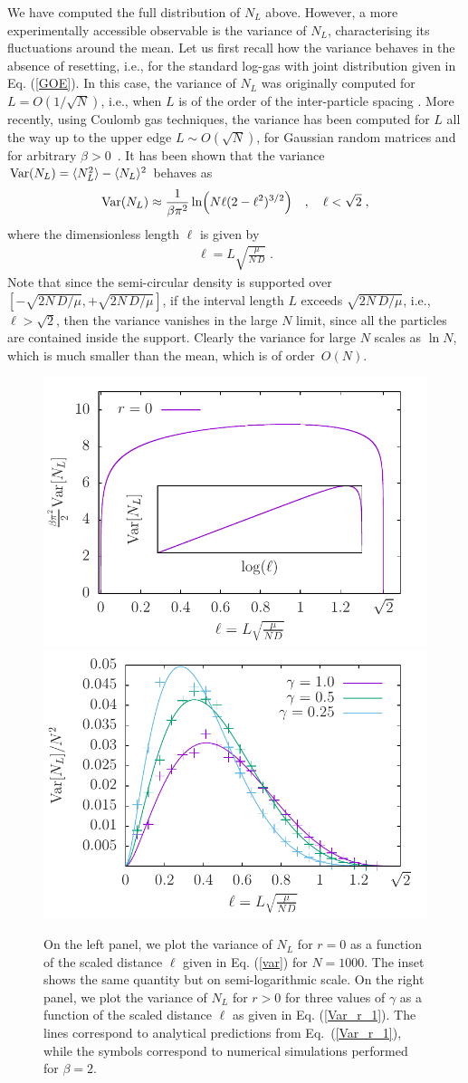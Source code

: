 \documentclass[onecolumn,superscriptaddress,
 amsmath,amssymb,
 aps,
 prd,
]{revtex4-1}
\newcommand{\bea}{\begin{eqnarray}}
\newcommand{\eea}{\end{eqnarray}}
\begin{document}
\vspace*{0.3cm}
 We have computed the full distribution of $N_L$ above. However, a more experimentally accessible observable is the variance of $N_L$, characterising its fluctuations around the mean. Let us first recall how the variance behaves in the absence of resetting, i.e., for the standard log-gas with joint distribution given in Eq. (\ref{GOE}). In this case, the variance of $N_L$ was originally computed for $L = O(1/\sqrt{N})$, i.e., when $L$ is of the order of the inter-particle spacing \cite{DM63,CL95,FS95}. More recently, using Coulomb gas techniques, the variance has been computed for $L$ all the way up to the upper edge $L \sim O(\sqrt{N})$, for Gaussian random matrices and for arbitrary $\beta > 0$~\cite{MMSV14,MMSV16}. It has been shown that the variance ${\rm Var}(N_L) = \langle N_L^2\rangle - \langle N_L \rangle^2$ behaves as
\bea \label{var}
{\rm Var}(N_L) \approx \frac{1}{\beta \pi^2} \ln (N \ell (2-\ell^2)^{3/2}) \quad, \quad \ell < \sqrt{2} \;,
\eea   
where the dimensionless length $\ell$ is given by
\bea \label{ell}
\ell = L \sqrt{\frac{\mu}{N\,D}} \;.
\eea
Note that since the semi-circular density is supported over $[-\sqrt{2 N\,D/\mu}, +\sqrt{2 N\,D/\mu}]$, if the interval length $L$ exceeds $\sqrt{2 N\,D/\mu}$, i.e., $\ell > \sqrt{2}$, then the variance vanishes in the large $N$ limit, since all the particles are contained inside the support. Clearly the variance for large $N$ scales as $\ln N$, which is much smaller than the mean, which is of order~$O(N)$.  
\begin{figure}[t]
\includegraphics[width = 0.45 \linewidth]{fcs_var_r0.pdf}\includegraphics[width = 0.45 \linewidth]{fcs_var.pdf}
\caption{On the left panel, we plot the variance of $N_L$ for $r=0$ as a function of the scaled distance $\ell$ given in Eq. (\ref{var}) for $N=1000$. The inset shows the same quantity but on semi-logarithmic scale. On the right panel, we plot the variance of $N_L$ for $r>0$ for three values of $\gamma$ as a function of the scaled distance $\ell$ as given in Eq. (\ref{Var_r_1}). The lines correspond to analytical predictions from Eq.~(\ref{Var_r_1}), while the symbols correspond to numerical simulations performed for $\beta = 2$.}\label{Fig:variance}
\end{figure}
\end{document}
